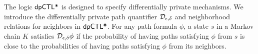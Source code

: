 
The logic $\textsf{dpCTL*}$ is designed to specify differentially private
mechanisms. We introduce the differentially private path quantifier
$\mathcal{D}_{{\epsilon}, {\delta}}$ and neighborhood relations for neighbors in
$\textsf{dpCTL*}$. For any path formula 
$\phi$, a state $s$ in a Markov chain $K$ satisfies
$\mathcal{D}_{{\epsilon}, {\delta}} \phi$ if the probability of having paths 
satisfying $\phi$ from $s$ is close to the probabilities of
having paths satisfying $\phi$ from its neighbors.

